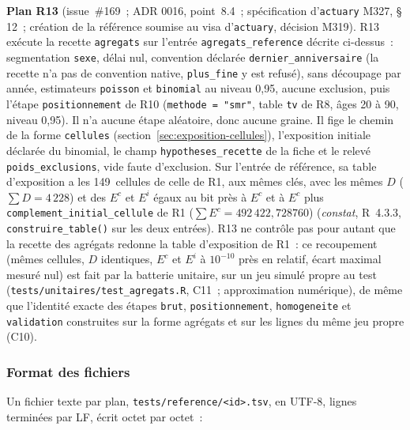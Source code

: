 \documentclass[a4paper,11pt]{article}
\newcommand{\code}[1]{\texttt{\small #1}}
\begin{document}
\medskip
\noindent
\textbf{Plan R13} (issue~\#169~; ADR 0016, point~8.4~; spécification
d'\code{actuary} M327, § 12~; création de la référence soumise au visa
d'\code{actuary}, décision M319). R13 exécute
la recette \code{agregats} sur l'entrée \code{agregats\_reference}
décrite ci-dessus~: segmentation \code{sexe}, délai nul, convention
déclarée \code{dernier\_anniversaire} (la recette n'a pas de convention
native, \code{plus\_fine} y est refusé), sans découpage par année,
estimateurs \code{poisson} et \code{binomial} au niveau 0,95, aucune
exclusion, puis l'étape \code{positionnement} de R10 (\code{methode =
"smr"}, table \code{tv} de R8, âges 20 à 90, niveau 0,95). Il n'a aucune
étape aléatoire, donc aucune graine. Il fige le chemin de la forme
\code{cellules} (section~\ref{sec:exposition-cellules}), l'exposition
initiale déclarée du binomial, le champ \code{hypotheses\_recette} de la
fiche et le relevé \code{poids\_exclusions}, vide faute d'exclusion.
Sur l'entrée de référence, sa table d'exposition a les 149~cellules de
celle de R1, aux mêmes clés, avec les mêmes $D$ ($\sum D = 4\,228$) et des
$E^c$ et $E^i$ égaux au bit près à $E^c$ et à $E^c$ plus
\code{complement\_initial\_cellule} de R1 ($\sum E^c = 492\,422{,}728760$)
(\emph{constat}, R~4.3.3, \code{construire\_table()} sur les deux
entrées). R13 ne contrôle pas pour autant que la recette des agrégats
redonne la table d'exposition de R1~: ce recoupement (mêmes cellules, $D$
identiques, $E^c$ et $E^i$ à $10^{-10}$ près en relatif, écart maximal
mesuré nul) est fait par la batterie unitaire, sur un jeu simulé propre au
test (\code{tests/unitaires/test\_agregats.R}, C11~; approximation
numérique), de même que l'identité exacte des étapes \code{brut},
\code{positionnement}, \code{homogeneite} et \code{validation}
construites sur la forme agrégats et sur les lignes du même jeu propre
(C10).

\subsubsection*{Format des fichiers}

Un fichier texte par plan, \code{tests/reference/<id>.tsv}, en UTF-8, lignes
terminées par LF, écrit octet par octet~:
\end{document}
